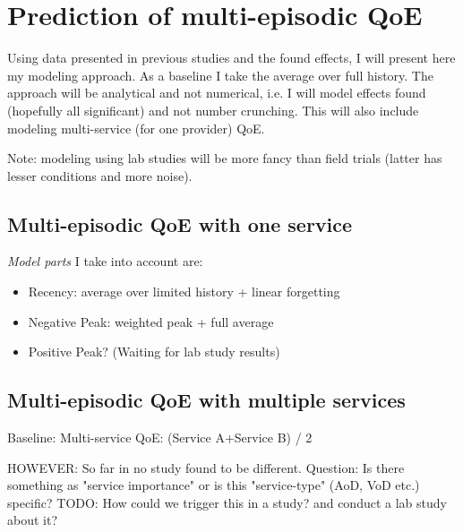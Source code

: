 \chapter{Prediction of multi-episodic QoE}\label{chap:08}
\begin{chapter-abstract}
Using data presented in previous studies and the found effects, I will present here my modeling approach.
As a baseline I take the average over full history.
The approach will be analytical and not numerical, i.e. I will model effects found (hopefully all significant) and not number crunching.
This will also include modeling multi-service (for one provider) QoE.

Note: modeling using lab studies will be more fancy than field trials (latter has lesser conditions and more noise).
\end{chapter-abstract}


\section{Multi-episodic QoE with one service}
\textit{Model parts} I take into account are:
\begin{itemize}
\item Recency: average over limited history + linear forgetting
\item Negative Peak: weighted peak + full average
\item Positive Peak? (Waiting for lab study results)
\end{itemize}

\section{Multi-episodic QoE with multiple services}
Baseline: Multi-service QoE: (Service A+Service B) / 2

HOWEVER: So far in no study found to be different.
Question: Is there something as "service importance" or is this "service-type" (AoD, VoD etc.) specific?
TODO: How could we trigger this in a study? and conduct a lab study about it?